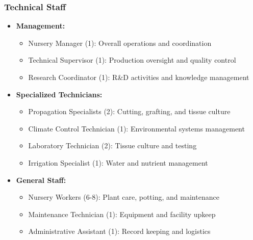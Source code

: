 \subsubsection{Technical Staff}
\begin{itemize}
    \item \textbf{Management:}
    \begin{itemize}
        \item Nursery Manager (1): Overall operations and coordination
        \item Technical Supervisor (1): Production oversight and quality control
        \item Research Coordinator (1): R\&D activities and knowledge management
    \end{itemize}
    
    \item \textbf{Specialized Technicians:}
    \begin{itemize}
        \item Propagation Specialists (2): Cutting, grafting, and tissue culture
        \item Climate Control Technician (1): Environmental systems management
        \item Laboratory Technician (2): Tissue culture and testing
        \item Irrigation Specialist (1): Water and nutrient management
    \end{itemize}
    
    \item \textbf{General Staff:}
    \begin{itemize}
        \item Nursery Workers (6-8): Plant care, potting, and maintenance
        \item Maintenance Technician (1): Equipment and facility upkeep
        \item Administrative Assistant (1): Record keeping and logistics
    \end{itemize}
\end{itemize}

